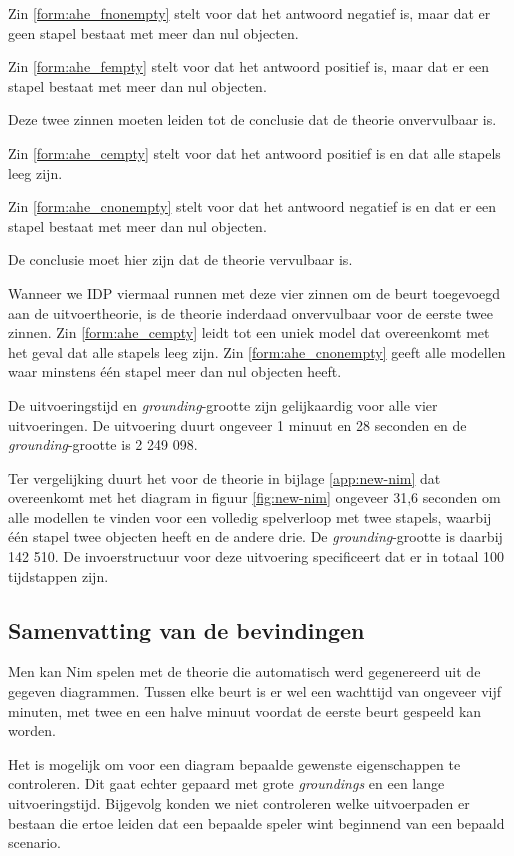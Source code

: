 Zin \ref{form:ahe_fnonempty} stelt voor dat het antwoord negatief is, maar dat er geen stapel bestaat met meer dan nul objecten.

Zin \ref{form:ahe_fempty} stelt voor dat het antwoord positief is, maar dat er een stapel bestaat met meer dan nul objecten.

Deze twee zinnen moeten leiden tot de conclusie dat de theorie onvervulbaar is.

Zin \ref{form:ahe_cempty} stelt voor dat het antwoord positief is en dat alle stapels leeg zijn.

Zin \ref{form:ahe_cnonempty} stelt voor dat het antwoord negatief is en dat er een stapel bestaat met meer dan nul objecten.

De conclusie moet hier zijn dat de theorie vervulbaar is.

Wanneer we IDP viermaal runnen met deze vier zinnen om de beurt toegevoegd aan de uitvoertheorie, is de theorie inderdaad onvervulbaar voor de eerste twee zinnen. Zin \ref{form:ahe_cempty} leidt tot een uniek model dat overeenkomt met het geval dat alle stapels leeg zijn. Zin \ref{form:ahe_cnonempty} geeft alle modellen waar minstens \'e\'en stapel meer dan nul objecten heeft.

De uitvoeringstijd en \textit{grounding}-grootte zijn gelijkaardig voor alle vier uitvoeringen. De uitvoering duurt ongeveer 1 minuut en 28 seconden en de \textit{grounding}-grootte is 2 249 098.

Ter vergelijking duurt het voor de theorie in bijlage \ref{app:new-nim} dat overeenkomt met het diagram in figuur \ref{fig:new-nim} ongeveer 31,6 seconden om alle modellen te vinden voor een volledig spelverloop met twee stapels, waarbij \'e\'en stapel twee objecten heeft en de andere drie. De \textit{grounding}-grootte is daarbij 142 510. De invoerstructuur voor deze uitvoering specificeert dat er in totaal 100 tijdstappen zijn.

\subsection{Samenvatting van de bevindingen}
Men kan Nim spelen met de theorie die automatisch werd gegenereerd uit de gegeven diagrammen. Tussen elke beurt is er wel een wachttijd van ongeveer vijf minuten, met twee en een halve minuut voordat de eerste beurt gespeeld kan worden.

Het is mogelijk om voor een diagram bepaalde gewenste eigenschappen te controleren. Dit gaat echter gepaard met grote \textit{groundings} en een lange uitvoeringstijd. Bijgevolg konden we niet controleren welke uitvoerpaden er bestaan die ertoe leiden dat een bepaalde speler wint beginnend van een bepaald scenario.

